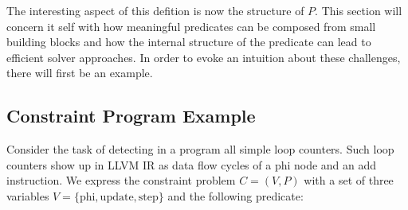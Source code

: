     The interesting aspect of this defition is now the structure of $P$.
    This section will concern it self with how meaningful predicates can be
    composed from small building blocks and how the internal structure of the
    predicate can lead to efficient solver approaches.
    In order to evoke an intuition about these challenges, there will first be
    an example.

\subsection{Constraint Program Example}

    Consider the task of detecting in a program all simple loop counters.
    Such loop counters show up in LLVM IR as data flow cycles of a phi node
    and an add instruction.
    We express the constraint problem $C=(V,P)$ with a set of three variables
    $V=\{\text{phi}, \text{update}, \text{step}\}$ and the following predicate:

